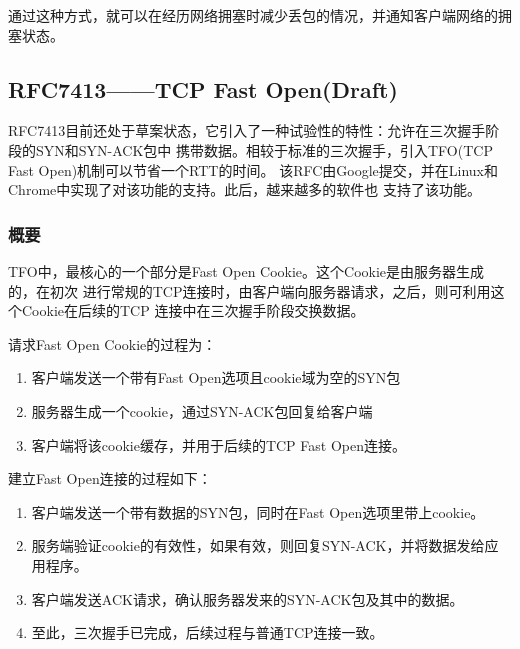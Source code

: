 通过这种方式，就可以在经历网络拥塞时减少丢包的情况，并通知客户端网络的拥塞状态。

\subsection{RFC7413——TCP Fast Open(Draft)}
\label{subsec:rfc7413}

RFC7413目前还处于草案状态，它引入了一种试验性的特性：允许在三次握手阶段的SYN和SYN-ACK包中
携带数据。相较于标准的三次握手，引入TFO(TCP Fast Open)机制可以节省一个RTT的时间。
该RFC由Google提交，并在Linux和Chrome中实现了对该功能的支持。此后，越来越多的软件也
支持了该功能。

\subsubsection{概要}
\label{subsubsec:rfc7413-overview}
TFO中，最核心的一个部分是Fast Open Cookie。这个Cookie是由服务器生成的，在初次
进行常规的TCP连接时，由客户端向服务器请求，之后，则可利用这个Cookie在后续的TCP
连接中在三次握手阶段交换数据。

请求Fast Open Cookie的过程为：
\begin{enumerate}
  \item 客户端发送一个带有Fast Open选项且cookie域为空的SYN包
  \item 服务器生成一个cookie，通过SYN-ACK包回复给客户端
  \item 客户端将该cookie缓存，并用于后续的TCP Fast Open连接。
\end{enumerate}

建立Fast Open连接的过程如下：
\begin{enumerate}
  \item 客户端发送一个带有数据的SYN包，同时在Fast Open选项里带上cookie。
  \item 服务端验证cookie的有效性，如果有效，则回复SYN-ACK，并将数据发给应用程序。
  \item 客户端发送ACK请求，确认服务器发来的SYN-ACK包及其中的数据。
  \item 至此，三次握手已完成，后续过程与普通TCP连接一致。
\end{enumerate}

